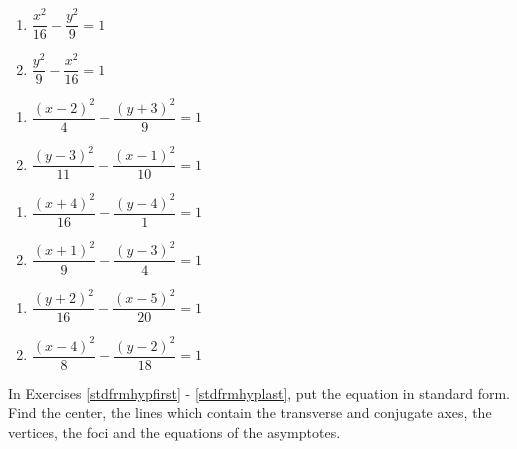 \begin{multicols}{2}
\begin{enumerate}

\item $\dfrac{x^{2}}{16} - \dfrac{y^{2}}{9} = 1$ \label{graphhyperbolafirst}

\item $\dfrac{y^{2}}{9} - \dfrac{x^{2}}{16} = 1$ 



\setcounter{HW}{\value{enumi}}
\end{enumerate}
\end{multicols}

\begin{multicols}{2}
\begin{enumerate}
\setcounter{enumi}{\value{HW}}

\item $\dfrac{(x - 2)^{2}}{4} - \dfrac{(y + 3)^{2}}{9} = 1$
\item $\dfrac{(y - 3)^{2}}{11} - \dfrac{(x - 1)^{2}}{10} = 1$


\setcounter{HW}{\value{enumi}}
\end{enumerate}
\end{multicols}

\begin{multicols}{2}
\begin{enumerate}
\setcounter{enumi}{\value{HW}}


\item $\dfrac{(x + 4)^{2}}{16} - \dfrac{(y - 4)^{2}}{1} = 1$
\item  $\dfrac{(x+1)^2}{9} - \dfrac{(y-3)^2}{4} = 1$


\setcounter{HW}{\value{enumi}}
\end{enumerate}
\end{multicols}

\begin{multicols}{2}
\begin{enumerate}
\setcounter{enumi}{\value{HW}}

\item  $\dfrac{(y+2)^2}{16} - \dfrac{(x-5)^2}{20} = 1$
\item  $\dfrac{(x-4)^2}{8} - \dfrac{(y-2)^2}{18} = 1$ \label{graphhyperbolalast}

\setcounter{HW}{\value{enumi}}
\end{enumerate}
\end{multicols}

In Exercises \ref{stdfrmhypfirst} - \ref{stdfrmhyplast}, put the equation in standard form.  Find the center, the lines which contain the transverse and conjugate axes, the vertices, the foci and the equations of the asymptotes.

